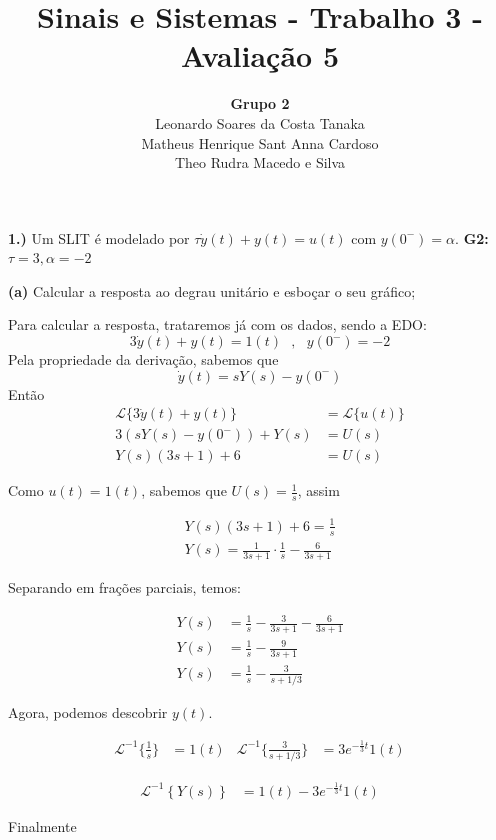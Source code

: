 \documentclass{article}
\title{Sinais e Sistemas - Trabalho 3 - Avaliação 5}
\author{
    \textbf{Grupo 2}\\
    Leonardo Soares da Costa Tanaka\\
    Matheus Henrique Sant Anna Cardoso\\
    Theo Rudra Macedo e Silva
}
\date{}
\begin{document}
\maketitle
\thispagestyle{capa}

\newpage

\textbf{1.)} Um SLIT é modelado por $\tau \dot{y}(t) + y(t) = u(t)$ com $y(0^{-}) = \alpha$.
\textbf{G2:} $\tau = 3, \alpha = -2$

\textbf{(a)} Calcular a resposta ao degrau unitário e esboçar o seu gráfico;

Para calcular a resposta, trataremos já com os dados, sendo a EDO:
\[3\dot{y}(t) + y(t) = 1(t)\,\,\,\,,\,\,\,\,y(0^{-}) = -2\]
Pela propriedade da derivação, sabemos que
\[\dot{y}(t) = sY(s) - y(0^{-})\]
Então
\begin{align*}
    \mathcal{L}\{3\dot{y}(t) + y(t)\} &= \mathcal{L}\{u(t)\}\\
    3(sY(s) - y(0^-)) + Y(s) &= U(s)\\
    Y(s)(3s + 1) + 6 &= U(s)
\end{align*}

Como $u(t) = 1(t)$, sabemos que $U(s) = \frac{1}{s}$, assim

\begin{align*}
    Y(s)(3s + 1) + 6 = \frac{1}{s}\\
    Y(s) = \frac{1}{3s + 1} \cdot \frac{1}{s} - \frac{6}{3s + 1}
\end{align*}

Separando em frações parciais, temos:

\begin{align*}
    Y(s) &= \frac{1}{s} - \frac{3}{3s + 1} - \frac{6}{3s + 1}\\
    Y(s) &= \frac{1}{s} - \frac{9}{3s + 1}\\
    Y(s) &= \frac{1}{s} - \frac{3}{s + 1/3}
\end{align*}

Agora, podemos descobrir $y(t)$.

\begin{align*}
    \mathcal{L}^{-1} \biggl\{\frac{1}{s}\biggr\} &= 1(t) & \mathcal{L}^{-1}\biggl\{\frac{3}{s + 1/3}\biggr\} &= 3e^{-\frac{1}{3}t}1(t)
\end{align*}

\begin{align*}
    \mathcal{L}^{-1} \left\{Y(s)\right\} &= 1(t) - 3e^{-\frac{1}{3}t}1(t)
\end{align*}

Finalmente
\end{document}
